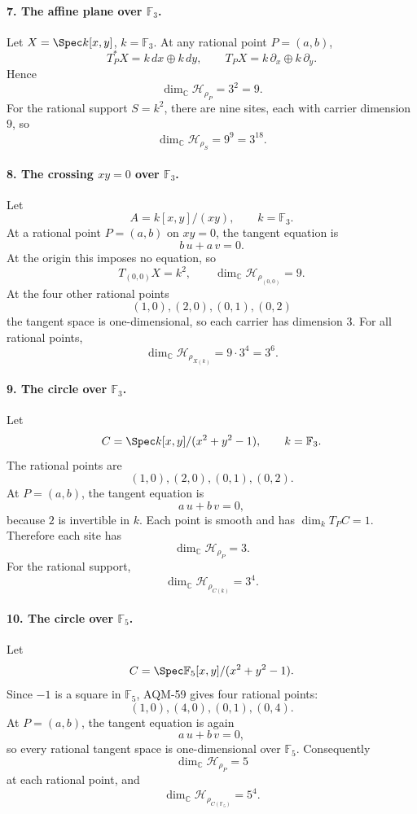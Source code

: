 \paragraph{7. The affine plane over \(\mathbb F_3\).}
Let \(X=\Spec k[x,y]\), \(k=\mathbb F_3\).  At any rational point \(P=(a,b)\),
\[
  T_P^*X=k\,dx\oplus k\,dy,\qquad
  T_PX=k\,\partial_x\oplus k\,\partial_y.
\]
Hence
\[
  \dim_{\mathbb C}\mathcal H_{\rho_P}=3^2=9.
\]
For the rational support \(S=k^2\), there are nine sites, each with carrier
dimension \(9\), so
\[
  \dim_{\mathbb C}\mathcal H_{\rho_S}=9^9=3^{18}.
\]

\paragraph{8. The crossing \(xy=0\) over \(\mathbb F_3\).}
Let
\[
  A=k[x,y]/(xy),\qquad k=\mathbb F_3.
\]
At a rational point \(P=(a,b)\) on \(xy=0\), the tangent equation is
\[
  b\,u+a\,v=0.
\]
At the origin this imposes no equation, so
\[
  T_{(0,0)}X=k^2,\qquad
  \dim_{\mathbb C}\mathcal H_{\rho_{(0,0)}}=9.
\]
At the four other rational points
\[
  (1,0),(2,0),(0,1),(0,2)
\]
the tangent space is one-dimensional, so each carrier has dimension \(3\).
For all rational points,
\[
  \dim_{\mathbb C}\mathcal H_{\rho_{X(k)}}=9\cdot3^4=3^6.
\]

\paragraph{9. The circle over \(\mathbb F_3\).}
Let
\[
  C=\Spec k[x,y]/(x^2+y^2-1),\qquad k=\mathbb F_3.
\]
The rational points are
\[
  (1,0),(2,0),(0,1),(0,2).
\]
At \(P=(a,b)\), the tangent equation is
\[
  a\,u+b\,v=0,
\]
because \(2\) is invertible in \(k\).  Each point is smooth and has
\(\dim_kT_PC=1\).  Therefore each site has
\[
  \dim_{\mathbb C}\mathcal H_{\rho_P}=3.
\]
For the rational support,
\[
  \dim_{\mathbb C}\mathcal H_{\rho_{C(k)}}=3^4.
\]

\paragraph{10. The circle over \(\mathbb F_5\).}
Let
\[
  C=\Spec \mathbb F_5[x,y]/(x^2+y^2-1).
\]
Since \(-1\) is a square in \(\mathbb F_5\), AQM-59 gives four rational points:
\[
  (1,0),(4,0),(0,1),(0,4).
\]
At \(P=(a,b)\), the tangent equation is again
\[
  a\,u+b\,v=0,
\]
so every rational tangent space is one-dimensional over \(\mathbb F_5\).
Consequently
\[
  \dim_{\mathbb C}\mathcal H_{\rho_P}=5
\]
at each rational point, and
\[
  \dim_{\mathbb C}\mathcal H_{\rho_{C(\mathbb F_5)}}=5^4.
\]

